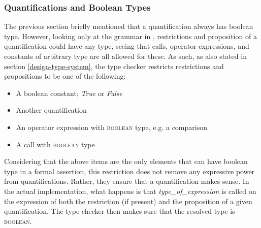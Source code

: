 \subsubsection{Quantifications and Boolean Types}
\label{implementation-def-boolean-type}
The previous section briefly mentioned that a quantification always has boolean type. However, looking only at the grammar in \cite{walden1995}, restrictions and proposition of a quantification could have any type, seeing that calls, operator expressions, and constants of arbitrary type are all allowed for these. As such, as also stated in section \ref{design-type-system}, the type checker restricts restrictions and propositions to be one of the following:
\begin{itemize}
\item A boolean constant; \textit{True} or \textit{False}
\item Another quantification
\item An operator expression with \textsc{boolean} type, e.g. a comparison
\item A call with \textsc{boolean} type
\end{itemize}
Considering that the above items are the only elements that can have boolean type in a formal assertion, this restriction does not remove any expressive power from quantifications. Rather, they ensure that a quantification makes sense. In the actual implementation, what happens is that \textit{type\_of\_expression} is called on the expression of both the restriction (if present) and the proposition of a given quantification. The type checker then makes sure that the resolved type is \textsc{boolean}.